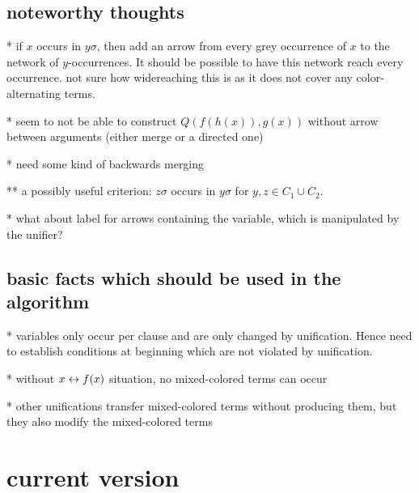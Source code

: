 \documentclass[,%
	paper=a4,%
	DIV10, %
	twoside=false,%
	liststotoc,
	bibtotoc,
	draft=false,%
	numbers=noendperiod
]{scrartcl}
\begin{document}
\newcommand{\substremarksym}{$\ast$}
\newcommand{\substremarkref}{$(\ast)$}

\newcommand{\lif}[1]{\lift{\Delta}{#1}{x}}
\newcommand{\newterm}{^*}
\newcommand{\de}{^\Delta}


\subsection*{noteworthy thoughts}

{\large

* if $x$ occurs in $y\sigma$, then add an arrow from every grey occurrence of $x$ to the network of $y$-occurrences. It should be possible to have this network reach every occurrence. not sure how widereaching this is as it does not cover any color-alternating terms.

}
* seem to not be able to construct $Q(f(h(x)), g(x))$ without arrow between arguments (either merge or a directed one) 

* need some kind of backwards merging

** a possibly useful criterion: $z\sigma$ occurs in $y\sigma$ for $y, z \in C_1 \cup C_2$.

* what about label for arrows containing the variable, which is manipulated by the unifier?

\subsection*{basic facts which should be used in the algorithm}

* variables only occur per clause and are only changed by unification. Hence need to establish conditions at beginning which are not violated by unification.

* without $x \leftrightarrow f(x)$ situation, no mixed-colored terms can occur

* other unifications transfer mixed-colored terms without producing them, but they also modify the mixed-colored terms




\section{current version}



\end{document}
